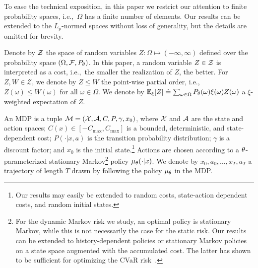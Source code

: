 \documentclass{article} %
\begin{document}
To ease the technical exposition, in this paper we restrict our attention to finite probability spaces, i.e.,~$\Omega$ has a finite number of elements. Our results can be extended to the $L_p$-normed spaces without loss of generality, but the details are omitted for brevity.

Denote by $\mathcal Z$ the space of random variables $Z:\Omega\mapsto (-\infty,\infty)$ defined over the probability space $(\Omega, \mathcal F, P_{\theta})$. In this paper, a random variable $Z\in \mathcal Z$ is interpreted as a cost, i.e.,~the smaller the realization of $Z$, the better. For $Z,W\in\mathcal Z$, we denote by $Z\leq W$ the point-wise partial order, i.e.,~$Z(\omega)\leq W(\omega)$ for all $\omega\in \Omega$. We denote by $\mathbb E_{\xi}[Z]\doteq \sum_{\omega\in\Omega}P_{\theta}(\omega)\xi(\omega)Z(\omega)$ a $\xi$-weighted expectation of $Z$.%

An MDP is a tuple $\mathcal{M}=({\mathcal{X}},{\mathcal{A}},C,P,\gamma,x_0)$, where ${\mathcal{X}}$ and ${\mathcal{A}}$ are the state and action spaces; $C(x)\in[-C_{\max},C_{\max}]$ is a bounded, deterministic, and state-dependent cost; $P(\cdot|x,a)$ is the transition probability distribution; $\gamma$ is a discount factor; and $x_0$ is the initial state.\footnote{Our results may easily be extended to random costs, state-action dependent costs, and random initial states.} Actions are chosen according to a $\theta$-parameterized stationary Markov\footnote{For the dynamic Markov risk we study, an optimal policy is stationary Markov, while this is not necessarily the case for the static risk. Our results can be extended to history-dependent policies or stationary Markov policies on a state space augmented with the accumulated cost. The latter has shown to be sufficient for optimizing the CVaR risk~\cite{bauerle2011markov}.} policy $\mu_{\theta}(\cdot|x)$. We denote by $x_0,a_0,\dots,x_T,a_T$ a trajectory of length $T$ drawn by following the policy $\mu_{\theta}$ in the MDP.


\vspace{-0.1in}
\end{document}
